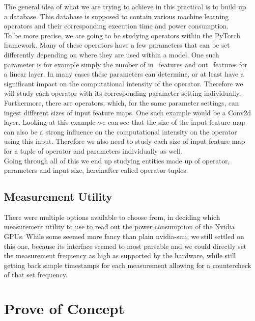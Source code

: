 \documentclass[conference]{IEEEtran}
\begin{document}
The general idea of what we are trying to achieve in this practical is to build up a database. This database is supposed to contain various machine learning operators and their corresponding execution time and power consumption. \\
To be more precise, we are going to be studying operators within the PyTorch framework. Many of these operators have a few parameters that can be set differently depending on where they are used within a model. One such parameter is for example simply the number of in\_features and out\_features for a linear layer. In many cases these parameters can determine, or at least have a significant impact on the computational intensity of the operator. Therefore we will study each operator with its corresponding parameter setting individually. Furthermore, there are operators, which, for the same parameter settings, can ingest different sizes of input feature maps. One such example would be a Conv2d layer. Looking at this example we can see that the size of the input feature map can also be a strong influence on the computational intensity on the operator using this input. Therefore we also need to study each size of input feature map for a tuple of operator and parameters individually as well. \\
Going through all of this we end up studying entities made up of operator, parameters and input size, hereinafter called operator tuples.  \\




\subsection{Measurement Utility}
There were multiple options available to choose from, in deciding which measurement utility to use to read out the power consumption of the Nvidia GPUs. While some seemed more fancy than plain nvidia-smi, we still settled on this one, because its interface seemed to most parsable and we could directly set the measurement frequency as high as supported by the hardware, while still getting back simple timestamps for each measurement allowing for a countercheck of that set frequency. 


\section{Prove of Concept}
\end{document}
